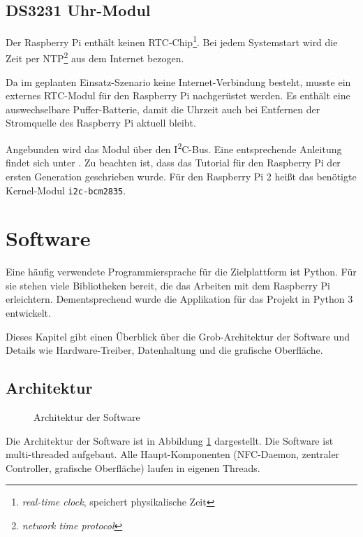\documentclass[11pt,a4paper]{IEEEtran}
\begin{document}
\subsection{DS3231 Uhr-Modul}

Der Raspberry Pi enthält keinen RTC-Chip\footnote{\emph{real-time clock},
speichert physikalische Zeit}. Bei jedem Systemstart wird die Zeit per
NTP\footnote{\emph{network time protocol}} aus dem Internet bezogen.

Da im geplanten Einsatz-Szenario keine Internet-Verbindung besteht, musste ein
externes RTC-Modul für den Raspberry Pi nachgerüstet werden. Es enthält eine
auswechselbare Puffer-Batterie, damit die Uhrzeit auch bei Entfernen der
Stromquelle des Raspberry Pi aktuell bleibt. 

Angebunden wird das Modul über den I\textsuperscript{2}C-Bus. Eine entsprechende
Anleitung findet sich unter \autocite{DS3231Tutorial}. Zu beachten ist, dass
das Tutorial für den Raspberry Pi der ersten Generation geschrieben wurde. Für
den Raspberry Pi 2 heißt das benötigte Kernel-Modul \texttt{i2c-bcm2835}.

\section{Software} 
\label{sec:sw}

Eine häufig verwendete Programmiersprache für die Zielplattform ist Python. Für
sie stehen viele Bibliotheken bereit, die das Arbeiten mit dem Raspberry Pi 
erleichtern. Dementsprechend wurde die Applikation für das Projekt in Python 3
entwickelt.

Dieses Kapitel gibt einen Überblick über die Grob-Architektur der Software und
Details wie Hardware-Treiber, Datenhaltung und die grafische Oberfläche.

\subsection{Architektur}

\begin{figure}[htb]
    \centering
    
    \caption{Architektur der Software}
    \label{fig:arch}
\end{figure}

Die Architektur der Software ist in Abbildung \ref{fig:arch} dargestellt. Die
Software ist multi-threaded aufgebaut. Alle Haupt-Komponenten (NFC-Daemon,
zentraler Controller, grafische Oberfläche) laufen in eigenen Threads. 
\end{document}
